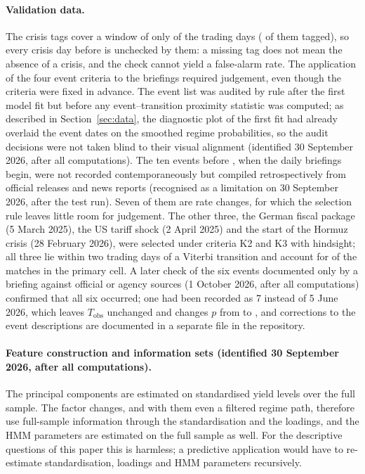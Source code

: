 \documentclass[11pt,a4paper]{article}
\begin{document}
\paragraph{Validation data.} The crisis tags cover a window of only \NWindowDays{} of the \NDays{} trading days (\NTagsTD{} of them tagged), so every crisis day before \TagStart{} is unchecked by them: a missing tag does not mean the absence of a crisis, and the check cannot yield a false-alarm rate. The application of the four event criteria to the briefings required judgement, even though the criteria were fixed in advance. The event list was audited by rule after the first model fit but before any event--transition proximity statistic was computed; as described in Section~\ref{sec:data}, the diagnostic plot of the first fit had already overlaid the event dates on the smoothed regime probabilities, so the audit decisions were not taken blind to their visual alignment (identified 30 September 2026, after all computations). The ten events before \TagStart{}, when the daily briefings begin, were not recorded contemporaneously but compiled retrospectively from official releases and news reports (recognised as a limitation on 30 September 2026, after the test run). Seven of them are rate changes, for which the selection rule leaves little room for judgement. The other three, the German fiscal package (5 March 2025), the US tariff shock (2 April 2025) and the start of the Hormuz crisis (28 February 2026), were selected under criteria K2 and K3 with hindsight; all three lie within two trading days of a Viterbi transition and account for \NRetroHits{} of the \Tobs{} matches in the primary cell. A later check of the six events documented only by a briefing against official or agency sources (1 October 2026, after all computations) confirmed that all six occurred; one had been recorded as 7 instead of 5 June 2026, which leaves $T_{\mathrm{obs}}$ unchanged and changes $p$ from \Pprim{} to \PaltSrc{}, and corrections to the event descriptions are documented in a separate file in the repository.

\paragraph{Feature construction and information sets (identified 30 September 2026, after all computations).} The principal components are estimated on standardised yield levels over the full sample. The factor changes, and with them even a filtered regime path, therefore use full-sample information through the standardisation and the loadings, and the HMM parameters are estimated on the full sample as well. For the descriptive questions of this paper this is harmless; a predictive application would have to re-estimate standardisation, loadings and HMM parameters recursively.
\end{document}
